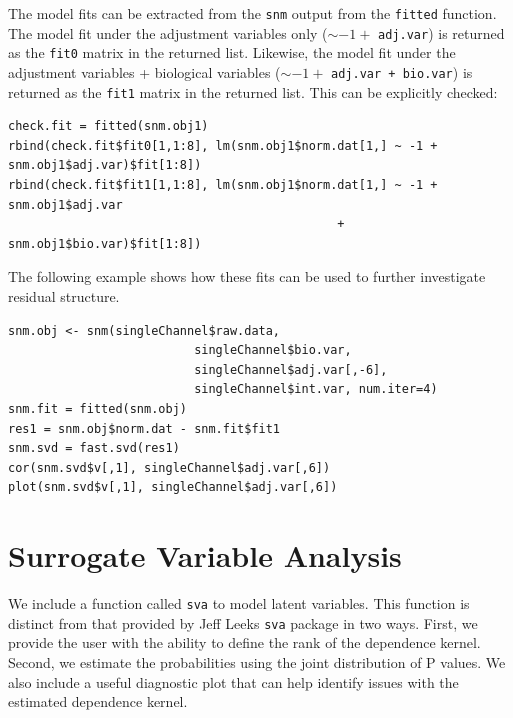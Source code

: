 \documentclass[11pt]{article}
\newcommand{\Rfunction}[1]{{\texttt{#1}}}
\newcommand{\Rpackage}[1]{{\texttt{#1}}}
\begin{document}
The model fits can be extracted from the \Rfunction{snm} output from the {\tt fitted} function.  The model fit under the adjustment variables only ($\sim -1 +$ {\tt adj.var}) is returned as the {\tt fit0} matrix in the returned list.  Likewise, the model fit under the adjustment variables + biological variables ($\sim -1 +$ {\tt adj.var + bio.var}) is returned as the {\tt fit1} matrix in the returned list.  This can be explicitly checked:

\begin{verbatim}
check.fit = fitted(snm.obj1)
rbind(check.fit$fit0[1,1:8], lm(snm.obj1$norm.dat[1,] ~ -1 + snm.obj1$adj.var)$fit[1:8])
rbind(check.fit$fit1[1,1:8], lm(snm.obj1$norm.dat[1,] ~ -1 + snm.obj1$adj.var 
                                              + snm.obj1$bio.var)$fit[1:8])
\end{verbatim}

The following example shows how these fits can be used to further investigate residual structure.

\begin{verbatim}
snm.obj <- snm(singleChannel$raw.data,
                          singleChannel$bio.var,
                          singleChannel$adj.var[,-6],
                          singleChannel$int.var, num.iter=4)
snm.fit = fitted(snm.obj)
res1 = snm.obj$norm.dat - snm.fit$fit1
snm.svd = fast.svd(res1)
cor(snm.svd$v[,1], singleChannel$adj.var[,6])
plot(snm.svd$v[,1], singleChannel$adj.var[,6])
\end{verbatim}

\section{Surrogate Variable Analysis}\label{sva}
We include a function called \Rfunction{sva} to model latent variables.  This
function is distinct from that provided by Jeff Leeks \Rpackage{sva} package in
two ways.  First, we provide the user with the ability to define the rank of the
dependence kernel.  Second, we estimate the probabilities using the joint
distribution of P values.  We also include a useful diagnostic plot that can
help identify issues with the estimated dependence kernel.
\end{document}
